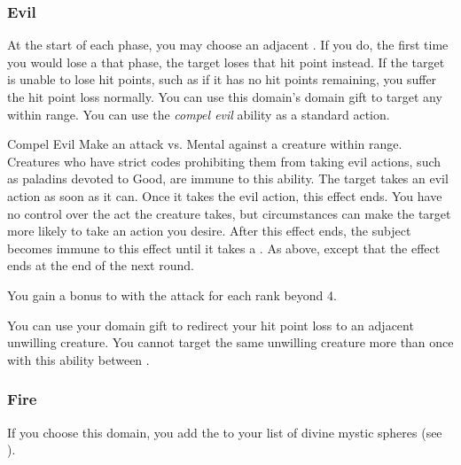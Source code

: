         \subsubsection{Evil}
             At the start of each phase, you may choose an adjacent .
            If you do, the first time you would lose a  that phase, the target loses that hit point instead.
            If the target is unable to lose hit points, such as if it has no hit points remaining, you suffer the hit point loss normally.
             You can use this domain's domain gift to target any  within \rngmed range.
             You can use the \textit{compel evil} ability as a standard action.
            \begin{durationability}{Compel Evil}
                \rankline
                Make an attack vs. Mental against a creature within \rngmed range.
                Creatures who have strict codes prohibiting them from taking evil actions, such as paladins devoted to Good, are immune to this ability.
                \hit The target takes an evil action as soon as it can.
                Once it takes the evil action, this effect ends.
                You have no control over the act the creature takes, but circumstances can make the target more likely to take an action you desire.
                After this effect ends, the subject becomes immune to this effect until it takes a .
                \glance As above, except that the effect ends at the end of the next round.

                \rankline
                You gain a  bonus to  with the attack for each rank beyond 4.
            \end{durationability}
             You can use your domain gift to redirect your hit point loss to an adjacent unwilling creature.
            You cannot target the same unwilling creature more than once with this ability between .

        \subsubsection{Fire}
            If you choose this domain, you add the   to your list of divine mystic spheres (see ).


